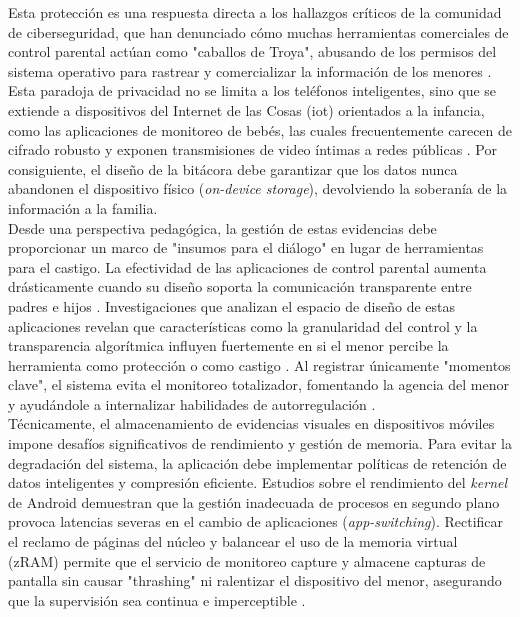 Esta protección es una respuesta directa a los hallazgos críticos de la comunidad de ciberseguridad, que han denunciado cómo muchas herramientas comerciales de control parental actúan como "caballos de Troya", abusando de los permisos del sistema operativo para rastrear y comercializar la información de los menores \cite{feal_angel_2020}. Esta paradoja de privacidad no se limita a los teléfonos inteligentes, sino que se extiende a dispositivos del Internet de las Cosas (\gls{iot}) orientados a la infancia, como las aplicaciones de monitoreo de bebés, las cuales frecuentemente carecen de cifrado robusto y exponen transmisiones de video íntimas a redes públicas \cite{schmidt_assessing_2023}. Por consiguiente, el diseño de la bitácora debe garantizar que los datos nunca abandonen el dispositivo físico (\textit{on-device storage}), devolviendo la soberanía de la información a la familia.\\


Desde una perspectiva pedagógica, la gestión de estas evidencias debe proporcionar un marco de "insumos para el diálogo" en lugar de herramientas para el castigo. La efectividad de las aplicaciones de control parental aumenta drásticamente cuando su diseño soporta la comunicación transparente entre padres e hijos \cite{stoilova_parental_2024}. Investigaciones que analizan el espacio de diseño de estas aplicaciones revelan que características como la granularidad del control y la transparencia algorítmica influyen fuertemente en si el menor percibe la herramienta como protección o como castigo \cite{wang_protection_2021}. Al registrar únicamente "momentos clave", el sistema evita el monitoreo totalizador, fomentando la agencia del menor y ayudándole a internalizar habilidades de autorregulación \cite{dumaru_its_2024}.\\

Técnicamente, el almacenamiento de evidencias visuales en dispositivos móviles impone desafíos significativos de rendimiento y gestión de memoria. Para evitar la degradación del sistema, la aplicación debe implementar políticas de retención de datos inteligentes y compresión eficiente. Estudios sobre el rendimiento del \textit{kernel} de Android demuestran que la gestión inadecuada de procesos en segundo plano provoca latencias severas en el cambio de aplicaciones (\textit{app-switching}). Rectificar el reclamo de páginas del núcleo y balancear el uso de la memoria virtual (zRAM) permite que el servicio de monitoreo capture y almacene capturas de pantalla sin causar "thrashing" ni ralentizar el dispositivo del menor, asegurando que la supervisión sea continua e imperceptible \cite{chou_rectifying_2023}.\\

